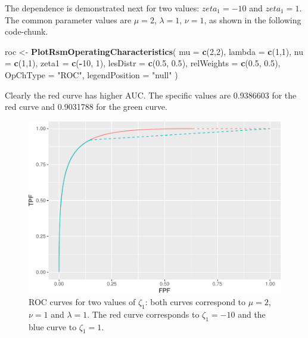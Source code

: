 \documentclass[
]{book}
\newenvironment{Shaded}{\begin{snugshade}}{\end{snugshade}}
\newcommand{\DataTypeTok}[1]{\textcolor[rgb]{0.13,0.29,0.53}{#1}}
\newcommand{\DecValTok}[1]{\textcolor[rgb]{0.00,0.00,0.81}{#1}}
\newcommand{\FloatTok}[1]{\textcolor[rgb]{0.00,0.00,0.81}{#1}}
\newcommand{\KeywordTok}[1]{\textcolor[rgb]{0.13,0.29,0.53}{\textbf{#1}}}
\newcommand{\NormalTok}[1]{#1}
\newcommand{\OperatorTok}[1]{\textcolor[rgb]{0.81,0.36,0.00}{\textbf{#1}}}
\newcommand{\StringTok}[1]{\textcolor[rgb]{0.31,0.60,0.02}{#1}}
\begin{document}
The dependence is demonstrated next for two values: \(zeta_1 = -10\) and \(zeta_1 = 1\). The common parameter values are \(\mu = 2\), \(\lambda = 1\), \(\nu = 1\), as shown in the following code-chunk.

\begin{Shaded}
\begin{Highlighting}[]
\NormalTok{roc <-}\StringTok{ }\KeywordTok{PlotRsmOperatingCharacteristics}\NormalTok{(}
     \DataTypeTok{mu =} \KeywordTok{c}\NormalTok{(}\DecValTok{2}\NormalTok{,}\DecValTok{2}\NormalTok{),}
     \DataTypeTok{lambda =} \KeywordTok{c}\NormalTok{(}\DecValTok{1}\NormalTok{,}\DecValTok{1}\NormalTok{),}
     \DataTypeTok{nu =} \KeywordTok{c}\NormalTok{(}\DecValTok{1}\NormalTok{,}\DecValTok{1}\NormalTok{),}
     \DataTypeTok{zeta1 =} \KeywordTok{c}\NormalTok{(}\OperatorTok{-}\DecValTok{10}\NormalTok{, }\DecValTok{1}\NormalTok{),}
     \DataTypeTok{lesDistr =} \KeywordTok{c}\NormalTok{(}\FloatTok{0.5}\NormalTok{, }\FloatTok{0.5}\NormalTok{),}
     \DataTypeTok{relWeights =} \KeywordTok{c}\NormalTok{(}\FloatTok{0.5}\NormalTok{, }\FloatTok{0.5}\NormalTok{),}
     \DataTypeTok{OpChType =} \StringTok{"ROC"}\NormalTok{,}
     \DataTypeTok{legendPosition =} \StringTok{"null"}
\NormalTok{)}
\end{Highlighting}
\end{Shaded}

Clearly the red curve has higher AUC. The specific values are 0.9386603 for the red curve and 0.9031788 for the green curve.

\begin{figure}
\centering
\includegraphics{07-rsm-predictions_files/figure-latex/rsm-pred-roc-zeta1-1.pdf}
\caption{\label{fig:rsm-pred-roc-zeta1}ROC curves for two values of \(\zeta_1\): both curves correspond to \(\mu = 2\), \(\nu = 1\) and \(\lambda = 1\). The red curve corresponds to \(\zeta_1 = -10\) and the blue curve to \(\zeta_1 = 1\).}
\end{figure}
\end{document}

